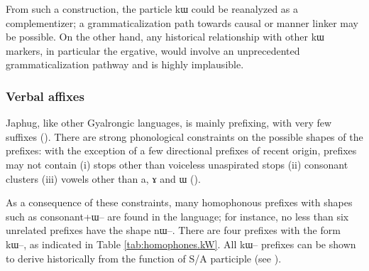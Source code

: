 \documentclass[oldfontcommands,oneside,a4paper,11pt]{article}
\newcommand{\ipa}[1]{{\phon #1}} %
\begin{document}
 From such a construction, the particle \ipa{kɯ} could be reanalyzed as a complementizer; a grammaticalization path towards causal or manner linker may be possible. On the other hand, any historical relationship with other \ipa{kɯ} markers, in particular the ergative, would involve an unprecedented grammaticalization pathway and is highly implausible.
    
\subsubsection{Verbal affixes}
Japhug, like other Gyalrongic languages, is mainly prefixing, with very few suffixes (\citealt{jacques13harmonization}).  There are strong phonological constraints on the possible shapes of the prefixes: with the exception of a few directional prefixes of recent origin, prefixes may not contain (i)  stops other than voiceless unaspirated stops (ii) consonant clusters (iii) vowels other than \ipa{a}, \ipa{ɤ} and \ipa{ɯ}  (\citealt{jacques14antipassive}).  

 As a consequence of these constraints, many homophonous prefixes with shapes such as consonant+\ipa{ɯ--}  are found in the language; for instance, no less than six  unrelated prefixes have the shape \ipa{nɯ--}. There are four prefixes with the form \ipa{kɯ--}, as indicated in Table \ref{tab:homophones.kW}.  All \ipa{kɯ--} prefixes can be shown to derive historically from the function of S/A participle (see \citealt{jacques15generic}).  
\end{document}
